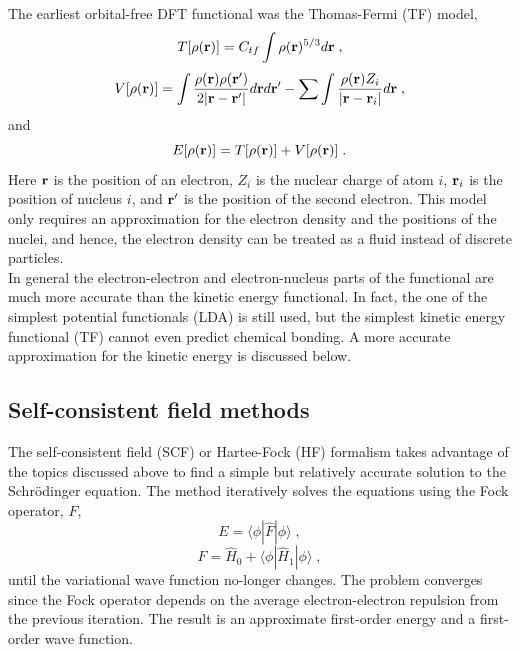 \documentclass[12pt]{report}
\begin{document}
The earliest orbital-free DFT functional was the Thomas-Fermi (TF) model,
\begin{equation}
 T[\rho({\textbf r})] = C_{tf}\int \rho({\textbf r})^{5/3}d{\textbf r} \; ,
\end{equation}
\begin{equation}
 V[\rho({\textbf r})] = \int
 \frac{\rho({\textbf r})\rho({\textbf r}')}{2|{\textbf r}-{\textbf r}'|}
 d{\textbf r}d{\textbf r}'
 -\sum \int \frac{\rho({\textbf r})Z_i}{|{\textbf r}-{\textbf r}_i|}
 d{\textbf r} \; ,
\end{equation}
and
\begin{equation}
 E[\rho({\textbf r})] = T[\rho({\textbf r})]+V[\rho({\textbf r})] \; .
\end{equation}
Here ${\textbf r}$ is the position of an electron, $Z_i$ is the nuclear charge
of atom $i$, ${\textbf r}_i$ is the position of nucleus $i$, and
${\textbf r}'$ is the position of the second electron.
This model only requires an approximation for the electron density and the
positions of the nuclei, and hence, the electron density can be treated as a
fluid instead of discrete particles. \\

In general the electron-electron and electron-nucleus parts of the functional
are much more accurate than the kinetic energy functional.
In fact, the one of the simplest potential functionals (LDA) is still used,
but the simplest kinetic energy functional (TF) cannot even predict chemical
bonding.
A more accurate approximation for the kinetic energy is discussed below.

\subsection{Self-consistent field methods}

The self-consistent field (SCF) or Hartee-Fock (HF) formalism takes advantage
of the topics discussed above to find a simple but relatively accurate
solution to the Schr\"{o}dinger equation.
The method iteratively solves the equations using the Fock operator, $F$,
\begin{equation}
 E = \langle\phi|\hat F|\phi\rangle \; ,
\end{equation}
\begin{equation}
 \hat F = \hat H_0+\langle\phi|\hat H_1|\phi\rangle \; ,
\end{equation}
until the variational wave function no-longer changes.
The problem converges since the Fock operator depends on the average
electron-electron repulsion from the previous iteration.
The result is an approximate first-order energy and a first-order wave
function. \\
\end{document}
